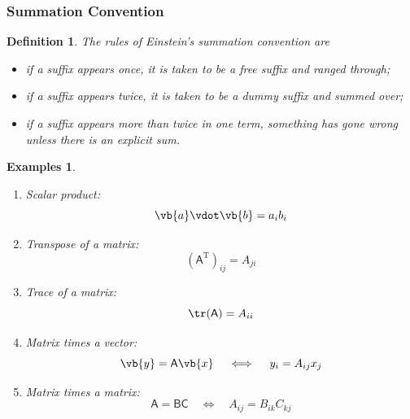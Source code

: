\documentclass{article}
\theoremstyle{plain}\theoremheaderfont{\normalfont\itshape}\theorembodyfont{\rmfamily}\theoremseparator{.}\newtheorem*{rem}{Remark}\newtheorem*{ex}{Example}\newtheorem*{proof}{Proof}\newtheorem*{altp}{Alternative proof}
\theoremstyle{plain}\theoremheaderfont{\normalfont\bfseries}\theorembodyfont{\rmfamily}\theoremseparator{.}\newtheorem{thm}{Theorem}[section]\newtheorem{lem}[thm]{Lemma}\newtheorem{prop}[thm]{Proposition}\newtheorem*{cor}{Corollary}\newtheorem{defn}[thm]{Definition}\newtheorem{clm}[thm]{Claim}\newtheorem{clminproof}{Claim}
\theoremstyle{break}\theoremheaderfont{\normalfont\itshape}\theorembodyfont{\rmfamily}\theoremseparator{.\medskip}\newtheorem*{proofskip}{Proof}\newtheorem*{exs}{Examples}\newtheorem*{rems}{Remarks}
\theoremstyle{break}\theoremheaderfont{\normalfont\bfseries}\theorembodyfont{\rmfamily}\theoremseparator{.\medskip}\newtheorem{lemskip}[thm]{Lemma}\newtheorem{defnskip}[thm]{Definition}\newtheorem{propskip}[thm]{Proposition}\newtheorem{thmskip}[thm]{Theorem}
\numberwithin{equation}{section}
\newcommand{\tp}{^\mathrm{T}}
\begin{document}
	\subsubsection{Summation Convention}
	\begin{defn}
		The rules of \textit{Einstein's summation convention} are
		\begin{itemize}[topsep=0pt]
			\item if a suffix appears once, it is taken to be a \textit{free suffix} and ranged through;
			\item if a suffix appears twice, it is taken to be a \textit{dummy suffix} and summed over;
			\item if a suffix appears more than twice in one term, something has gone wrong unless there is an explicit sum.
		\end{itemize}
	\end{defn}
	\begin{exs}
		\begin{enumerate}[topsep=0pt]
			\item Scalar product:
			\[\vb{a}\vdot\vb{b}=a_ib_i\]
			\item Transpose of a matrix:
			\[(\mathsf{A}\tp)_{ij}=A_{ji}\]
			\item Trace of a matrix:
			\[\tr(\mathsf{A})=A_{ii}\]
			\item Matrix times a vector:
			\[\vb{y}=\mathsf{A}\vb{x}\quad\iff\quad y_i=A_{ij}x_j\]
			\item Matrix times a matrix:
			\[\mathsf{A}=\mathsf{B}\mathsf{C}\quad\iff\quad A_{ij}=B_{ik}C_{kj}\]
		\end{enumerate}
	\end{exs}
	
\end{document}
